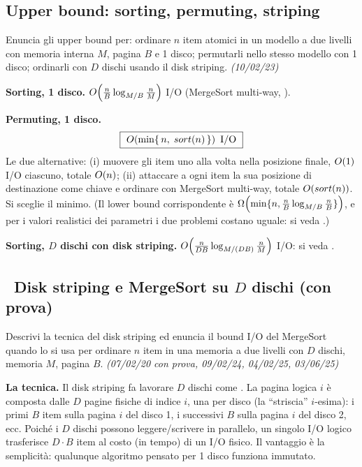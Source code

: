 \subsection*{ Upper bound: sorting, permuting, striping}

\begin{domanda}
Enuncia gli upper bound per: ordinare $n$ item atomici in un modello a due livelli con memoria
interna $M$, pagina $B$ e 1 disco; permutarli nello stesso modello con 1 disco; ordinarli con $D$
dischi usando il disk striping. \emph{(10/02/23)}
\end{domanda}

\textbf{Sorting, 1 disco.} $O\!\left(\frac{n}{B}\log_{M/B}\frac{n}{M}\right)$ I/O (MergeSort multi-way,
).

\textbf{Permuting, 1 disco.}
\[
\boxed{\ O\!\left(\min\{\,n,\; sort(n)\,\}\right) \text{ I/O}\ }
\]
Le due alternative: (i) muovere gli item uno alla volta nella posizione finale, $O\!\left(1\right)$ I/O
ciascuno, totale $O\!\left(n\right)$; (ii) attaccare a ogni item la sua posizione di destinazione come chiave
e ordinare con MergeSort multi-way, totale $O\!\left(sort(n)\right)$. Si sceglie il minimo. (Il lower bound
corrispondente \`e $\Omega\!\left(\min\{n,\frac{n}{B}\log_{M/B}\frac{n}{B}\}\right)$, e per i valori realistici dei
parametri i due problemi costano uguale: si veda .)

\textbf{Sorting, $D$ dischi con disk striping.} $O\!\left(\frac{n}{DB}\log_{M/(DB)}\frac{n}{M}\right)$ I/O:
si veda .

\subsection*{\hot\ Disk striping e MergeSort su $D$ dischi (con prova)}

\begin{domanda}
Descrivi la tecnica del disk striping ed enuncia il bound I/O del MergeSort quando lo si usa per
ordinare $n$ item in una memoria a due livelli con $D$ dischi, memoria $M$, pagina $B$.
\emph{(07/02/20 con prova, 09/02/24, 04/02/25, 03/06/25)}
\end{domanda}

\textbf{La tecnica.} Il disk striping fa lavorare $D$ dischi come . La pagina logica $i$ \`e composta dalle $D$ pagine fisiche di indice
$i$, una per disco (la ``striscia'' $i$-esima): i primi $B$ item sulla pagina $i$ del disco 1, i
successivi $B$ sulla pagina $i$ del disco 2, ecc. Poich\'e i $D$ dischi possono leggere/scrivere in
parallelo, un singolo I/O logico trasferisce $D\cdot B$ item al costo (in tempo) di un I/O fisico.
Il vantaggio \`e la semplicit\`a: qualunque algoritmo pensato per 1 disco funziona immutato.

